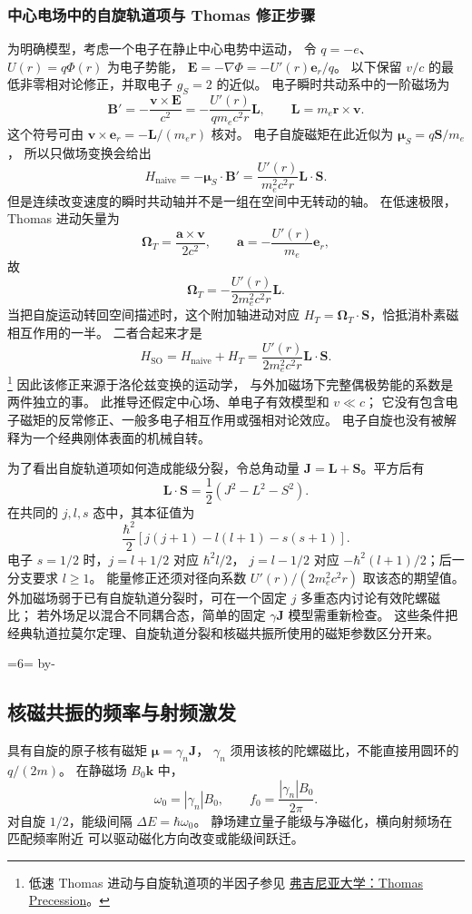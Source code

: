 \documentclass[UTF8,zihao=-4,fontset=fandol,a4paper]{ctexart}
\makeatletter
\newcommand{\vect}[1]{\bm{#1}}
\newcommand{\Needspace}[1]{\par\if@nobreak\else\penalty0\begingroup\dimen0=#1\relax\dimen2=\pagegoal\advance\dimen2 by-\pagetotal\ifdim\dimen0>\dimen2\newpage\fi\endgroup\fi}
\let\SavedSubsection\subsection
\renewcommand{\subsection}{\Needspace{6\baselineskip}\SavedSubsection}
\makeatother
\begin{document}
\subsubsection*{中心电场中的自旋轨道项与 Thomas 修正步骤}
为明确模型，考虑一个电子在静止中心电势中运动，
令 $q=-e$、$U(r)=q\Phi(r)$ 为电子势能，
$\vect E=-\nabla\Phi=-U'(r)\vect e_r/q$。
以下保留 $v/c$ 的最低非零相对论修正，并取电子 $g_S=2$ 的近似。
电子瞬时共动系中的一阶磁场为
\[
\vect B'=-\frac{\vect v\times\vect E}{c^2}
=-\frac{U'(r)}{q m_e c^2r}\vect L,
\qquad \vect L=m_e\vect r\times\vect v.
\]
这个符号可由 $\vect v\times\vect e_r=-\vect L/(m_er)$ 核对。
电子自旋磁矩在此近似为 $\vect\mu_S=q\vect S/m_e$，
所以只做场变换会给出
\[
H_{\text{naive}}=-\vect\mu_S\cdot\vect B'
=\frac{U'(r)}{m_e^2c^2r}\vect L\cdot\vect S.
\]
但是连续改变速度的瞬时共动轴并不是一组在空间中无转动的轴。
在低速极限，Thomas 进动矢量为
\[
\vect\Omega_T=\frac{\vect a\times\vect v}{2c^2},\qquad
\vect a=-\frac{U'(r)}{m_e}\vect e_r,
\]
故
\[
\vect\Omega_T=-\frac{U'(r)}{2m_e^2c^2r}\vect L.
\]
当把自旋运动转回空间描述时，这个附加轴进动对应
$H_T=\vect\Omega_T\cdot\vect S$，恰抵消朴素磁相互作用的一半。
二者合起来才是
\[
H_{\text{SO}}=H_{\text{naive}}+H_T
=\frac{U'(r)}{2m_e^2c^2r}\vect L\cdot\vect S.
\]
\footnote{低速 Thomas 进动与自旋轨道项的半因子参见
\href{https://galileoandeinstein.phys.virginia.edu/Elec_Mag/18_7420/18_7420_20_Thomas_Precession.pdf}{弗吉尼亚大学：Thomas Precession}。}
因此该修正来源于洛伦兹变换的运动学，
与外加磁场下完整偶极势能的系数是两件独立的事。
此推导还假定中心场、单电子有效模型和 $v\ll c$；
它没有包含电子磁矩的反常修正、一般多电子相互作用或强相对论效应。
电子自旋也没有被解释为一个经典刚体表面的机械自转。

为了看出自旋轨道项如何造成能级分裂，令总角动量
$\vect J=\vect L+\vect S$。平方后有
\[
\vect L\cdot\vect S=\frac12(J^2-L^2-S^2).
\]
在共同的 $j,l,s$ 态中，其本征值为
\[
\frac{\hbar^2}{2}[j(j+1)-l(l+1)-s(s+1)].
\]
电子 $s=1/2$ 时，$j=l+1/2$ 对应 $\hbar^2l/2$，
$j=l-1/2$ 对应 $-\hbar^2(l+1)/2$；后一分支要求 $l\ge1$。
能量修正还须对径向系数 $U'(r)/(2m_e^2c^2r)$ 取该态的期望值。
外加磁场弱于已有自旋轨道分裂时，可在一个固定 $j$ 多重态内讨论有效陀螺磁比；
若外场足以混合不同耦合态，简单的固定 $\gamma\vect J$ 模型需重新检查。
这些条件把经典轨道拉莫尔定理、自旋轨道分裂和核磁共振所使用的磁矩参数区分开来。


\subsection{核磁共振的频率与射频激发}\label{sub:c3-10.5}
具有自旋的原子核有磁矩 $\vect\mu=\gamma_n\vect J$，
$\gamma_n$ 须用该核的陀螺磁比，不能直接用圆环的 $q/(2m)$。
在静磁场 $B_0\vect k$ 中，
\[
\omega_0=|\gamma_n|B_0,\qquad
f_0=\frac{|\gamma_n|B_0}{2\pi}.
\]
对自旋 $1/2$，能级间隔 $\Delta E=\hbar\omega_0$。
静场建立量子能级与净磁化，横向射频场在匹配频率附近
可以驱动磁化方向改变或能级间跃迁。
\end{document}
